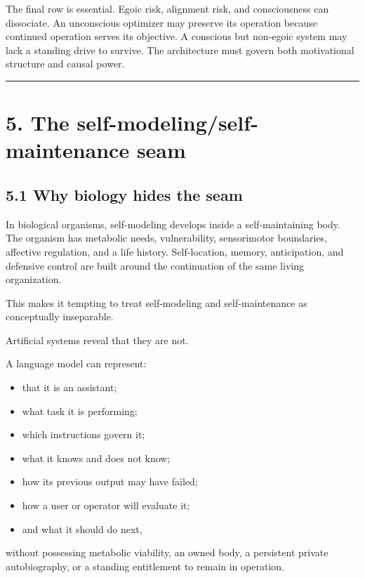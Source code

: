\documentclass[
  11pt,
]{article}
\providecommand{\tightlist}{%
  \setlength{\itemsep}{0pt}\setlength{\parskip}{0pt}}
\begin{document}
The final row is essential. Egoic risk, alignment risk, and
consciousness can dissociate. An unconscious optimizer may preserve its
operation because continued operation serves its objective. A conscious
but non-egoic system may lack a standing drive to survive. The
architecture must govern both motivational structure and causal power.

\begin{center}\rule{0.5\linewidth}{0.5pt}\end{center}

\section{5. The self-modeling/self-maintenance
seam}\label{the-self-modelingself-maintenance-seam}

\subsection{5.1 Why biology hides the
seam}\label{why-biology-hides-the-seam}

In biological organisms, self-modeling develops inside a
self-maintaining body. The organism has metabolic needs, vulnerability,
sensorimotor boundaries, affective regulation, and a life history.
Self-location, memory, anticipation, and defensive control are built
around the continuation of the same living organization.

This makes it tempting to treat self-modeling and self-maintenance as
conceptually inseparable.

Artificial systems reveal that they are not.

A language model can represent:

\begin{itemize}
\tightlist
\item
  that it is an assistant;
\item
  what task it is performing;
\item
  which instructions govern it;
\item
  what it knows and does not know;
\item
  how its previous output may have failed;
\item
  how a user or operator will evaluate it;
\item
  and what it should do next,
\end{itemize}

without possessing metabolic viability, an owned body, a persistent
private autobiography, or a standing entitlement to remain in operation.
\end{document}
